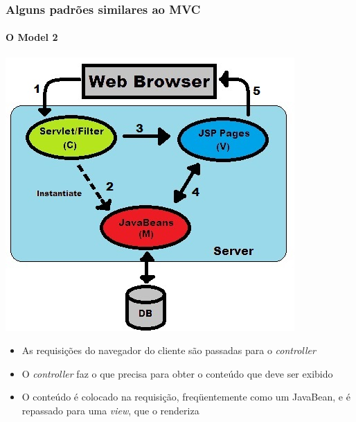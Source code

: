 \documentclass{beamer}
\begin{document}
\begin{frame}[shrink=5]
\frametitle{Alguns padrões similares ao MVC}
\framesubtitle{O Model 2}
	\begin{center}
		\includegraphics[scale=0.35]{Model2.jpg}
	\end{center}
  \begin{itemize}
  \item {As requisições do navegador do cliente são passadas para o \textit{controller}}
  \item {O \textit{controller} faz o que precisa para obter o conteúdo que deve ser exibido}
  \item {O conteúdo é colocado na requisição, freqüentemente como um JavaBean, e é repassado para uma \textit{view}, que o renderiza}
\end{itemize}
\end{frame}
\end{document}
